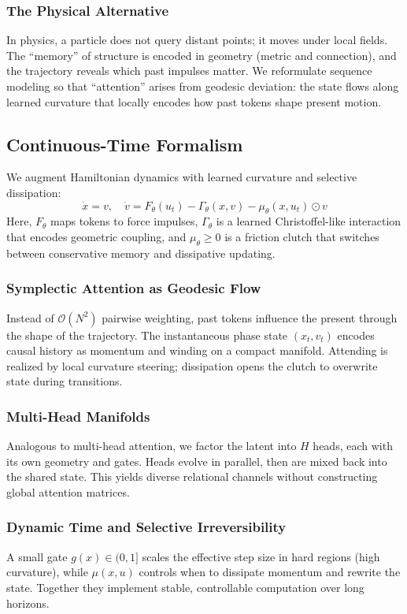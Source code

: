 \documentclass{article}
\numberwithin{equation}{section}
\begin{document}
\subsubsection{The Physical Alternative}
In physics, a particle does not query distant points; it moves under local fields. The ``memory'' of structure is encoded in geometry (metric and connection), and the trajectory reveals which past impulses matter. We reformulate sequence modeling so that ``attention'' arises from geodesic deviation: the state flows along learned curvature that locally encodes how past tokens shape present motion.

\subsection{Continuous-Time Formalism}
We augment Hamiltonian dynamics with learned curvature and selective dissipation:
\[
\dot{x} = v, \quad \dot{v} = F_\theta(u_t) - \Gamma_\theta(x, v) - \mu_\theta(x, u_t)\odot v
\]
Here, $F_\theta$ maps tokens to force impulses, $\Gamma_\theta$ is a learned Christoffel-like interaction that encodes geometric coupling, and $\mu_\theta\ge 0$ is a friction clutch that switches between conservative memory and dissipative updating.

\subsubsection{Symplectic Attention as Geodesic Flow}
Instead of $\mathcal{O}(N^2)$ pairwise weighting, past tokens influence the present through the shape of the trajectory. The instantaneous phase state $(x_t, v_t)$ encodes causal history as momentum and winding on a compact manifold. Attending is realized by local curvature steering; dissipation opens the clutch to overwrite state during transitions.

\subsubsection{Multi-Head Manifolds}
Analogous to multi-head attention, we factor the latent into $H$ heads, each with its own geometry and gates. Heads evolve in parallel, then are mixed back into the shared state. This yields diverse relational channels without constructing global attention matrices.

\subsubsection{Dynamic Time and Selective Irreversibility}
A small gate $g(x)\in(0,1]$ scales the effective step size in hard regions (high curvature), while $\mu(x,u)$ controls when to dissipate momentum and rewrite the state. Together they implement stable, controllable computation over long horizons.
\end{document}
